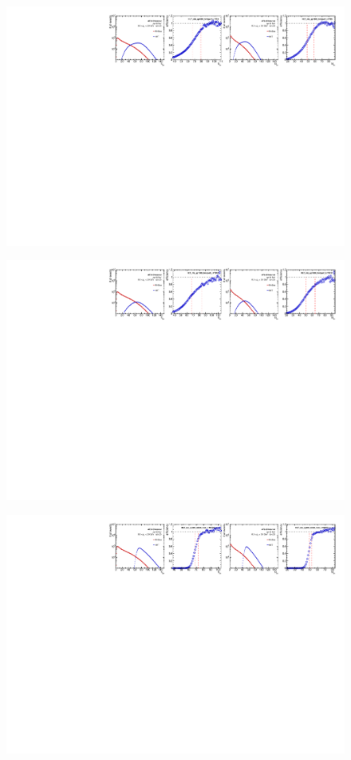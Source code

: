 \begin{figure}[H]
\centering
\includegraphics[width=1.\linewidth]{figs/sec_evtSlc/trigEff_pp13_run2/trigEff_Trig17.pdf}
\end{figure}
\begin{figure}[H]
\centering
\includegraphics[width=1.\linewidth]{figs/sec_evtSlc/trigEff_pp13_run2/trigEff_Trig18.pdf}
\end{figure}
\begin{figure}[H]
\centering
\includegraphics[width=1.\linewidth]{figs/sec_evtSlc/trigEff_pp13_run2/trigEff_Trig19.pdf}
\end{figure}
